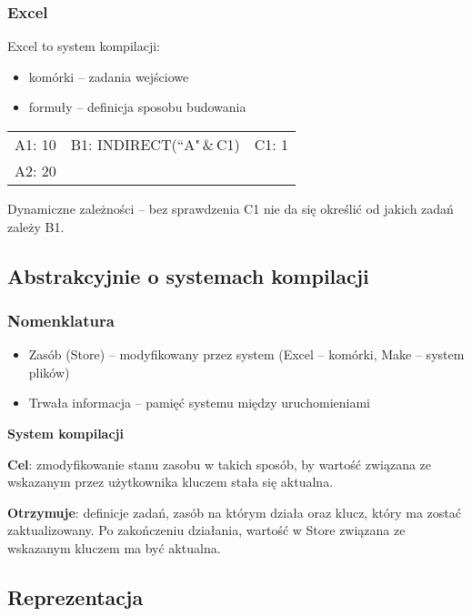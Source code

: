\begin{frame}
  \frametitle{Excel}

  Excel to system kompilacji:
  \begin{itemize}
  \item komórki -- zadania wejściowe
  \item formuły -- definicja sposobu budowania
  \end{itemize}

  \vspace{1em}
  \begin{tabular}{ l c r }
  A1: 10 & B1: INDIRECT(``A"\,\&\,C1) & C1: 1 \\
  A2: 20 & &
  \end{tabular}

  \vspace{1em}
  Dynamiczne zależności -- bez sprawdzenia C1 nie da się określić od jakich zadań zależy B1.
\end{frame}

\subsection{Abstrakcyjnie o systemach kompilacji}

\begin{frame}
  \frametitle{Nomenklatura}

  \begin{itemize}
  \item Zasób (Store) -- modyfikowany przez system (Excel -- komórki, Make -- system plików)
  \item Trwała informacja -- pamięć systemu między uruchomieniami
  \end{itemize}

  \vspace{1.25em}
  \textbf{System kompilacji}
  \vspace{.75em}
  
  \textbf{Cel}: zmodyfikowanie stanu zasobu w takich sposób, by wartość związana ze wskazanym przez użytkownika kluczem stała się aktualna.
  
  \textbf{Otrzymuje}: definicje zadań, zasób na którym działa oraz klucz, który ma zostać zaktualizowany. Po zakończeniu działania, wartość w Store związana ze wskazanym kluczem ma być aktualna.
\end{frame}
  
\subsection{Reprezentacja}

